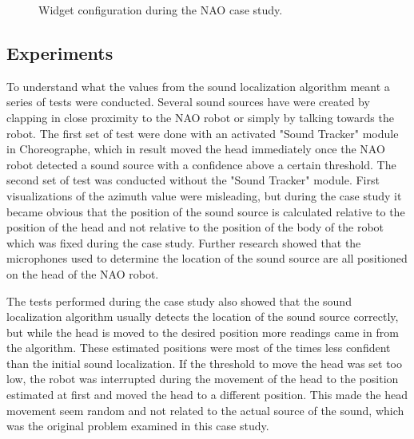 \begin{figure}[htpb]
  \centering
  \caption{Widget configuration during the NAO case study.}
  \label{nao_dashboard_screenshot}
\end{figure}

\subsection{Experiments}
To understand what the values from the sound localization algorithm meant a series of tests were conducted. Several sound sources have were created by clapping in close proximity to the NAO robot or simply by talking towards the robot. The first set of test were done with an activated "Sound Tracker" module in Choreographe, which in result moved the head immediately once the NAO robot detected a sound source with a confidence above a certain threshold. The second set of test was conducted without the "Sound Tracker" module. First visualizations of the azimuth value were misleading, but during the case study it became obvious that the position of the sound source is calculated relative to the position of the head and not relative to the position of the body of the robot which was fixed during the case study. Further research showed that the microphones used to determine the location of the sound source are all positioned on the head of the NAO robot.

The tests performed during the case study also showed that the sound localization algorithm usually detects the location of the sound source correctly, but while the head is moved to the desired position more readings came in from the algorithm. These estimated positions were most of the times less confident than the initial sound localization. If the threshold to move the head was set too low, the robot was interrupted during the movement of the head to the position estimated at first and moved the head to a different position. This made the head movement seem random and not related to the actual source of the sound, which was the original problem examined in this case study.

